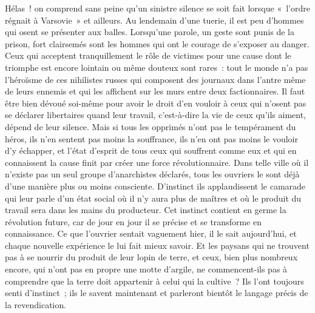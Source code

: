 \documentclass[french,twoside]{book} %
\begin{document}
 Hélas ! on comprend sans peine qu’un sinistre silence se soit fait lorsque « l’ordre régnait à Varsovie » et ailleurs. Au lendemain d’une tuerie, il est peu d’hommes qui osent se présenter aux balles. Lorsqu’une parole, un geste sont punis de la prison, fort clairsemés sont les hommes qui ont le courage de s’exposer au danger. Ceux qui acceptent tranquillement le rôle de victimes pour une cause dont le triomphe est encore lointain ou même douteux sont rares : tout le monde n’a pas l’héroïsme de ces nihilistes russes qui composent des journaux dans l’antre même de leurs ennemis et qui les affichent sur les murs entre deux factionnaires. Il faut être bien dévoué soi-même pour avoir le droit d’en vouloir à ceux qui n’osent pas  se déclarer libertaires quand leur travail, c’est-à-dire la vie de ceux qu’ils aiment, dépend de leur silence. Mais si tous les opprimés n’ont pas le tempérament du héros, ils n’en sentent pas moins la souffrance, ils n’en ont pas moins le vouloir d’y échapper, et l’état d’esprit de tous ceux qui souffrent comme eux et qui en connaissent la cause finit par créer une force révolutionnaire. Dans telle ville où il n’existe pas un seul groupe d’anarchistes déclarés, tous les ouvriers le sont déjà d’une manière plus ou moins consciente. D’instinct ils applaudissent le camarade qui leur parle d’un état social où il n’y aura plus de maîtres et où le produit du travail sera dans les mains du producteur. Cet instinct contient en germe la révolution  future, car de jour en jour il se précise et se transforme en connaissance. Ce que l’ouvrier sentait vaguement hier, il le sait aujourd’hui, et chaque nouvelle expérience le lui fait mieux savoir. Et les paysans qui ne trouvent pas à se nourrir du produit de leur lopin de terre, et ceux, bien plus nombreux encore, qui n’ont pas en propre une motte d’argile, ne commencent-ils pas à comprendre que la terre doit appartenir à celui qui la cultive ? Ils l’ont toujours senti d’instinct ; ils le savent maintenant et parleront bientôt le langage précis de la revendication.\par
\end{document}
